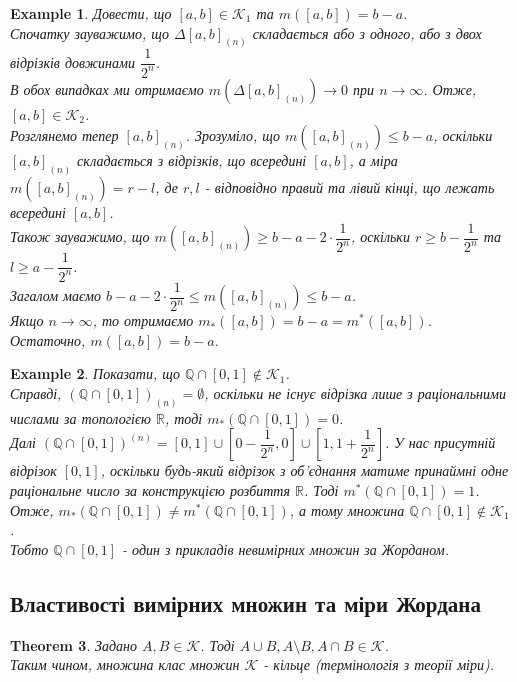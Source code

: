 \documentclass[a4paper, 10pt]{article}
\theoremstyle{theoremdd}
\newtheorem{theorem}{Theorem}[subsection]
\theoremstyle{theoremdd}
\theoremstyle{theoremdd}
\theoremstyle{theoremdd}
\newtheorem{example}[theorem]{Example}
\theoremstyle{theoremdd}
\theoremstyle{theoremdd}
\theoremstyle{theoremdd}
\theoremstyle{theoremdd}
\begin{document}
\begin{example}
Довести, що $[a,b] \in \mathcal{K}_1$ та $m([a,b]) = b-a$.\\
Спочатку зауважимо, що $\Delta [a,b]_{(n)}$ складається або з одного, або з двох відрізків довжинами $\dfrac{1}{2^n}$.\\
В обох випадках ми отримаємо $m(\Delta [a,b]_{(n)}) \to 0$ при $n \to \infty$. Отже, $[a,b] \in \mathcal{K}_2$.\\
Розглянемо тепер $[a,b]_{(n)}$. Зрозуміло, що $m([a,b]_{(n)}) \leq b-a$, оскільки $[a,b]_{(n)}$ складається з відрізків, що всередині $[a,b]$, а міра $m([a,b]_{(n)}) = r - l$, де $r,l$ - відповідно правий та лівий кінці, що лежать всередині $[a,b]$.\\
Також зауважимо, що $m([a,b]_{(n)}) \geq b-a -2 \cdot \dfrac{1}{2^n}$, оскільки $r \geq b- \dfrac{1}{2^n}$ та $l \geq a- \dfrac{1}{2^n}$.\\
Загалом маємо $b-a- 2 \cdot \dfrac{1}{2^n} \leq m([a,b]_{(n)}) \leq b-a$.\\
Якщо $n \to \infty$, то отримаємо $m_*([a,b]) = b-a = m^*([a,b])$.\\
Остаточно, $m([a,b]) = b-a$.
\end{example}

\begin{example}
Показати, що $\mathbb{Q} \cap [0,1] \not\in \mathcal{K}_1$.\\
Справді, $\left(\mathbb{Q} \cap [0,1] \right)_{(n)} = \emptyset$, оскільки не існує відрізка лише з раціональними числами за топологією $\mathbb{R}$, тоді $m_*(\mathbb{Q} \cap [0,1]) = 0$.\\
Далі $\left( \mathbb{Q} \cap [0,1] \right)^{(n)} = [0,1] \cup \left[ 0 - \dfrac{1}{2^n}, 0 \right] \cup \left[ 1, 1 + \dfrac{1}{2^n} \right]$. У нас присутній відрізок $[0,1]$, оскільки будь-який відрізок з об'єднання матиме принаймні одне раціональне число за конструкцією розбиття $\mathbb{R}$. Тоді $m^*(\mathbb{Q} \cap [0,1]) = 1$.\\
Отже, $m_*(\mathbb{Q} \cap [0,1]) \neq m^*(\mathbb{Q} \cap [0,1])$, а тому множина $\mathbb{Q} \cap [0,1] \not\in \mathcal{K}_1$.\\
Тобто $\mathbb{Q} \cap [0,1]$ - один з прикладів невимірних множин за Жорданом.
\end{example}

\subsection{Властивості вимірних множин та міри Жордана}
\begin{theorem}
Задано $A,B \in \mathcal{K}$. Тоді $A \cup B, A \setminus B, A \cap B \in \mathcal{K}$.\\
Таким чином, множина клас множин $\mathcal{K}$ - кільце (термінологія з теорії міри).
\end{theorem}
\end{document}
